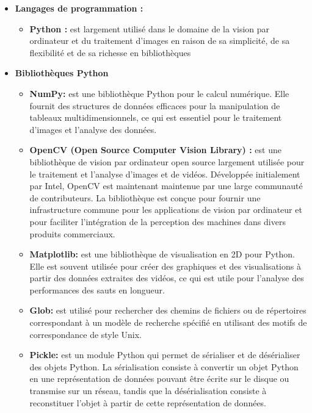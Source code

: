   \begin{itemize}[label={\Huge$\star$}]
  
  \item \textbf{Langages de programmation :}
  
  		\begin{itemize}
  			\item \textbf{Python :} est largement utilisé dans le domaine de la vision par ordinateur et du traitement d'images en raison de sa simplicité, de sa flexibilité et de sa richesse en bibliothèques
  		\end{itemize}
  		
  \item \textbf{Bibliothèques Python}
  
  		\begin{itemize}
  			\item \textbf{NumPy:} est une bibliothèque Python pour le calcul numérique. Elle fournit des structures de données efficaces pour la manipulation de tableaux multidimensionnels, ce qui est essentiel pour le traitement d'images et l'analyse des données.
  			
  			\item \textbf{OpenCV (Open Source Computer Vision Library) :} est une bibliothèque de vision par ordinateur open source largement utilisée pour le traitement et l'analyse d'images et de vidéos. Développée initialement par Intel, OpenCV est maintenant maintenue par une large communauté de contributeurs. La bibliothèque est conçue pour fournir une infrastructure commune pour les applications de vision par ordinateur et pour faciliter l'intégration de la perception des machines dans divers produits commerciaux.
  			
  			\item \textbf{Matplotlib:} est une bibliothèque de visualisation en 2D pour Python. Elle est souvent utilisée pour créer des graphiques et des visualisations à partir des données extraites des vidéos, ce qui est utile pour l'analyse des performances des sauts en longueur.
  			
  			\item\textbf{Glob:}  est utilisé pour rechercher des chemins de fichiers ou de répertoires correspondant à un modèle de recherche spécifié en utilisant des motifs de correspondance de style Unix.
  			
  			\item \textbf{Pickle:} est un module Python qui permet de sérialiser et de désérialiser des objets Python. La sérialisation consiste à convertir un objet Python en une représentation de données pouvant être écrite sur le disque ou transmise sur un réseau, tandis que la désérialisation consiste à reconstituer l'objet à partir de cette représentation de données.
  		\end{itemize}
  

\end{itemize}
